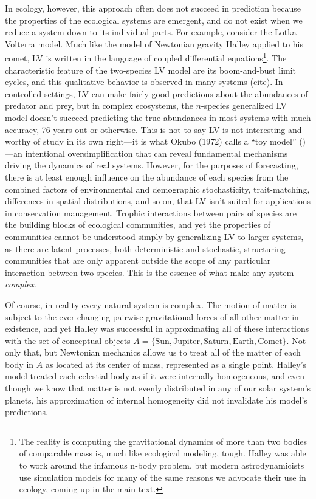\documentclass[]{article}
\begin{document}
In ecology, however, this approach often does not succeed in prediction
because the properties of the ecological systems are emergent, and do
not exist when we reduce a system down to its individual parts. For
example, consider the Lotka-Volterra model. Much like the model of
Newtonian gravity Halley applied to his comet, LV is written in the
language of coupled differential equations\footnote{The reality is
  computing the gravitational dynamics of more than two bodies of
  comparable mass is, much like ecological modeling, tough. Halley was
  able to work around the infamous n-body problem, but modern
  astrodynamicists use simulation models for many of the same reasons we
  advocate their use in ecology, coming up in the main text.}. The
characteristic feature of the two-species LV model are its boom-and-bust
limit cycles, and this qualitative behavior is observed in many systems
(cite). In controlled settings, LV can make fairly good predictions
about the abundances of predator and prey, but in complex ecosystems,
the \(n\)-species generalized LV model doesn't succeed predicting the
true abundances in most systems with much accuracy, 76 years out or
otherwise. This is not to say LV is not interesting and worthy of study
in its own right---it is what Okubo (1972) calls a ``toy model''
(\cite{cite_okubo})---an intentional oversimplification that can
reveal fundamental mechanisms driving the dynamics of real systems.
However, for the purposes of forecasting, there is at least enough
influence on the abundance of each species from the combined factors of
environmental and demographic stochasticity, trait-matching, differences
in spatial distributions, and so on, that LV isn't suited for
applications in conservation management. Trophic interactions between
pairs of species are the building blocks of ecological communities, and
yet the properties of communities cannot be understood simply by
generalizing LV to larger systems, as there are latent processes, both
deterministic and stochastic, structuring communities that are only
apparent outside the scope of any particular interaction between two
species. This is the essence of what make any system \emph{complex}.

Of course, in reality every natural system is complex. The motion of
matter is subject to the ever-changing pairwise gravitational forces of
all other matter in existence, and yet Halley was successful in
approximating all of these interactions with the set of conceptual
objects
\(A = \{\text{Sun}, \text{Jupiter}, \text{Saturn}, \text{Earth}, \text{Comet} \}\).
Not only that, but Newtonian mechanics allows us to treat all of the
matter of each body in \(A\) as located at its center of mass,
represented as a single point. Halley's model treated each celestial
body as if it were internally homogeneous, and even though we know that
matter is not evenly distributed in any of our solar system's planets,
his approximation of internal homogeneity did not invalidate his model's
predictions.
\end{document}
